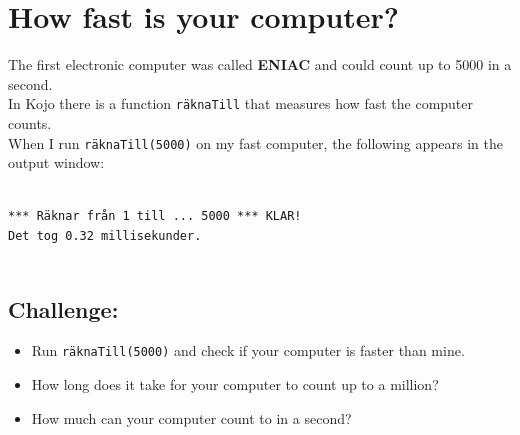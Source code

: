 \chapter{How fast is your computer?}The first electronic computer was called {\bf ENIAC} and could count up to 5000 in a second.\\
In Kojo there is a function \lstinline{räknaTill} that measures how fast the computer counts.\\
When I run \lstinline{räknaTill(5000)} on my fast computer, the following appears in the output window:

\begin{lstlisting}[numbers=none]

*** Räknar från 1 till ... 5000 *** KLAR!
Det tog 0.32 millisekunder.
      
\end{lstlisting}
        
\section*{\color{BrickRed}Challenge:}


\begin{itemize}

\item {Run \lstinline{räknaTill(5000)} and check if your computer is faster than mine.}
\item {How long does it take for your computer to count up to a million?}
\item {How much can your computer count to in a second?}

\end{itemize}


